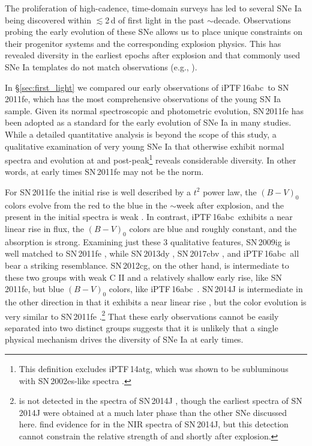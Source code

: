 \documentclass[twocolumn]{aastex61}
\newcommand{\abc}{iPTF\,16abc}
\begin{document}
The proliferation of high-cadence, time-domain surveys has led to several SNe Ia being discovered within $\lesssim$2\,d of first light in the past $\sim$decade. Observations probing the early evolution of these SNe allows us to place unique constraints on their progenitor systems and the corresponding explosion physics. This has revealed diversity in the earliest epochs after explosion and that commonly used SNe Ia templates do not match observations (e.g., \citealt{2012ApJ...744...38F}).

In \S\ref{sec:first_light} we compared our early observations of \abc\ to SN\,2011fe, which has the most comprehensive observations of the young SN Ia sample. Given its normal spectroscopic and photometric evolution, SN\,2011fe has been adopted as a standard for the early evolution of SNe Ia in many studies. While a detailed quantitative analysis is beyond the scope of this study, a qualitative examination of very young SNe Ia that otherwise exhibit normal spectra and evolution at and post-peak\footnote{This definition excludes iPTF\,14atg, which was shown to be subluminous with SN\,2002es-like spectra \citep{2015Natur.521..328C}.} reveals considerable diversity. In other words, at early times SN\,2011fe may not be the norm.

For SN\,2011fe the initial rise is well described by a $t^2$ power law, the $(B - V)_0$ colors evolve from the red to the blue in the $\sim$week after explosion, and the  present in the initial spectra is weak \citep{2011Natur.480..344N,2016ApJ...820...67Z,2012ApJ...752L..26P}. In contrast, \abc\ exhibits a near linear rise in flux, the $(B - V)_0$ colors are blue and roughly constant, and the  absorption is strong. Examining just these 3 qualitative features, SN\,2009ig is well matched to SN\,2011fe \citep{2012ApJ...744...38F}, while SN\,2013dy \citep{2013ApJ...778L..15Z}, SN\,2017cbv \citep{2017ApJ...845L..11H}, and \abc\ all bear a striking resemblance. SN\,2012cg, on the other hand, is intermediate to these two groups with weak C II and a relatively shallow early rise, like SN\,2011fe, but blue $(B - V)_0$ colors, like \abc\ \citep{2012ApJ...756L...7S,2016ApJ...820...92M}. SN\,2014J is intermediate in the other direction in that it exhibits a near linear rise \citep{2014ApJ...783L..24Z,2015ApJ...799..106G}, but the color evolution is very similar to SN\,2011fe \citep{2014ApJ...788L..21A}.\footnote{ is not detected in the spectra of SN\,2014J \citep{2014ApJ...784L..12G,2014ApJ...783L..24Z}, though the earliest spectra of SN\,2014J were obtained at a much later phase than the other SNe discussed here. \citet{2015ApJ...798...39M} find evidence for  in the NIR spectra of SN\,2014J, but this detection cannot constrain the relative strength of  and  shortly after explosion.} That these early observations cannot be easily separated into two distinct groups suggests that it is unlikely that a single physical mechanism drives the diversity of SNe Ia at early times. 
\end{document}
